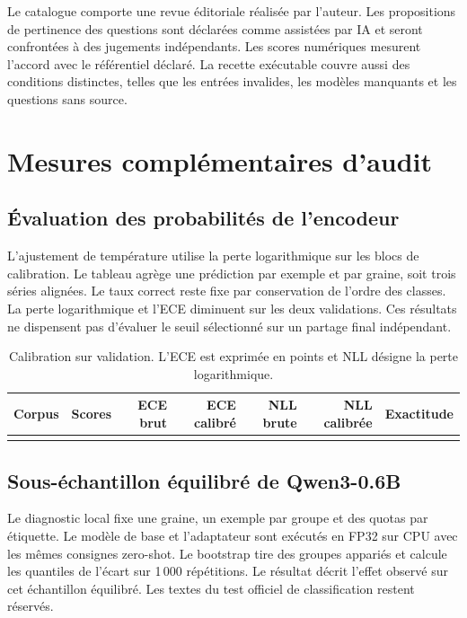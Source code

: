 Le catalogue comporte une revue éditoriale réalisée par l’auteur. Les propositions de pertinence des questions sont déclarées comme assistées par IA et seront confrontées à des jugements indépendants. Les scores numériques mesurent l’accord avec le référentiel déclaré. La recette exécutable couvre aussi des conditions distinctes, telles que les entrées invalides, les modèles manquants et les questions sans source.
\FloatBarrier

\section{Mesures complémentaires d’audit}\label{ann:audit}

\subsection{Évaluation des probabilités de l’encodeur}
L’ajustement de température utilise la perte logarithmique sur les blocs de calibration. Le tableau agrège une prédiction par exemple et par graine, soit trois séries alignées. Le taux correct reste fixe par conservation de l’ordre des classes. La perte logarithmique et l’ECE diminuent sur les deux validations. Ces résultats ne dispensent pas d’évaluer le seuil sélectionné sur un partage final indépendant.

\begin{table}[htbp]
\centering\small
\caption{Calibration sur validation. L’ECE est exprimée en points et NLL désigne la perte logarithmique.}
\begin{tabularx}{\linewidth}{@{}Yrrrrrr@{}}
\toprule
Corpus & Scores & ECE brut & ECE calibré & NLL brute & NLL calibrée & Exactitude \\
\midrule
{}
\bottomrule
\end{tabularx}
\end{table}

\subsection{Sous-échantillon équilibré de Qwen3-0.6B}
Le diagnostic local fixe une graine, un exemple par groupe et des quotas par étiquette. Le modèle de base et l’adaptateur sont exécutés en FP32 sur CPU avec les mêmes consignes zero-shot. Le bootstrap tire des groupes appariés et calcule les quantiles de l’écart sur 1\,000 répétitions. Le résultat décrit l’effet observé sur cet échantillon équilibré. Les textes du test officiel de classification restent réservés.

